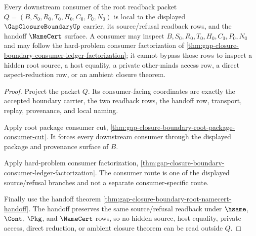 \begin{theorem}
\label{thm:gap-closure-boundary-root-consumer-locality}
Every downstream consumer of the root readback packet $Q=(B,S_0,R_0,T_0,H_0,C_0,P_0,N_0)$ is local to the displayed $\GapClosureBoundaryUp$ carrier, its source/refusal readback rows, and the handoff $\NameCert$ surface. A consumer may inspect $B,S_0,R_0,T_0,H_0,C_0,P_0,N_0$ and may follow the hard-problem consumer factorization of \autoref{thm:gap-closure-boundary-consumer-ledger-factorization}; it cannot bypass those rows to inspect a hidden root source, a host equality, a private other-minds access row, a direct aspect-reduction row, or an ambient closure theorem.
\end{theorem}
\begin{proof}
Project the packet $Q$. Its consumer-facing coordinates are exactly the accepted boundary carrier, the two readback rows, the handoff row, transport, replay, provenance, and local naming.

Apply root package consumer cut, \autoref{thm:gap-closure-boundary-root-package-consumer-cut}. It forces every downstream consumer through the displayed package and provenance surface of $B$.

Apply hard-problem consumer factorization, \autoref{thm:gap-closure-boundary-consumer-ledger-factorization}. The consumer route is one of the displayed source/refusal branches and not a separate consumer-specific route.

Finally use the handoff theorem \autoref{thm:gap-closure-boundary-root-namecert-handoff}. The handoff preserves the same source/refusal readback under $\hsame$, $\Cont$, $\Pkg$, and $\NameCert$ rows, so no hidden source, host equality, private access, direct reduction, or ambient closure theorem can be read outside $Q$.
\end{proof}
